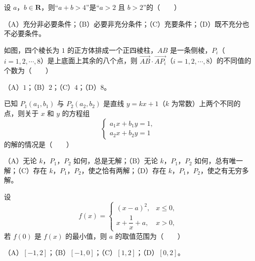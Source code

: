 \begin{question}
设 $a$，$b\in\mathbf R$，则“$a+b>4$”是“$a>2$ 且 $b>2$”的\mbox{（　　）}

（A）充分非必要条件；（B）必要非充分条件；（C）充要条件；（D）既不充分也不必要条件。

\Needspace{0.4\textheight}
\end{question}
\begin{question}
如图，四个棱长为 $1$ 的正方体排成一个正四棱柱，$AB$ 是一条侧棱，$P_i$（$i=1,2,\cdots,8$）是上底面上其余的八个点，则 $\overrightarrow{AB}\cdot\overrightarrow{AP_i}$（$i=1,2,\cdots,8$）的不同值的个数为\mbox{（　　）}
\nopagebreak[4]
\begin{center}\end{center}
\nopagebreak[4]
（A）$1$；（B）$2$；（C）$4$；（D）$8$。

\end{question}
\begin{question}
已知 $P_1(a_1,b_1)$ 与 $P_2(a_2,b_2)$ 是直线 $y=kx+1$（$k$ 为常数）上两个不同的点，则关于 $x$ 和 $y$ 的方程组
\nopagebreak[4]
\[\begin{cases}
a_1x+b_1y=1,\\
a_2x+b_2y=1
\end{cases}\]
的解的情况是\mbox{（　　）}

（A）无论 $k$，$P_1$，$P_2$ 如何，总是无解；（B）无论 $k$，$P_1$，$P_2$ 如何，总有唯一解；（C）存在 $k$，$P_1$，$P_2$，使之恰有两解；（D）存在 $k$，$P_1$，$P_2$，使之有无穷多解。

\end{question}
\begin{question}
设
\nopagebreak[4]
\[f(x)=\begin{cases}
(x-a)^2, & x\leqslant0,\\
x+\dfrac1x+a, & x>0,
\end{cases}\]
若 $f(0)$ 是 $f(x)$ 的最小值，则 $a$ 的取值范围为\mbox{（　　）}

（A）$[-1,2]$；（B）$[-1,0]$；（C）$[1,2]$；（D）$[0,2]$。

\end{question}

